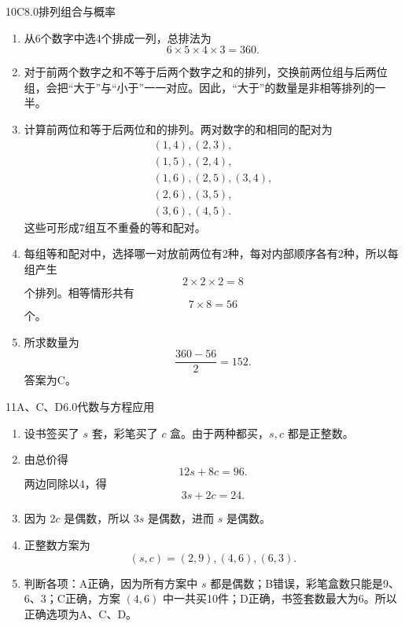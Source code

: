 \begin{solution}{10}{C}{8.0}{排列组合与概率}
\begin{enumerate}[label=\textbf{Step \arabic*:},leftmargin=*]
  \item 从6个数字中选4个排成一列，总排法为
  \[
    6\times5\times4\times3=360.
  \]
  \item 对于前两个数字之和不等于后两个数字之和的排列，交换前两位组与后两位组，会把“大于”与“小于”一一对应。因此，“大于”的数量是非相等排列的一半。
  \item 计算前两位和等于后两位和的排列。两对数字的和相同的配对为
  \[
  \begin{gathered}
    (1,4),(2,3),\\
    (1,5),(2,4),\\
    (1,6),(2,5),(3,4),\\
    (2,6),(3,5),\\
    (3,6),(4,5).
  \end{gathered}
  \]
  这些可形成7组互不重叠的等和配对。
  \item 每组等和配对中，选择哪一对放前两位有2种，每对内部顺序各有2种，所以每组产生
  \[
    2\times2\times2=8
  \]
  个排列。相等情形共有
  \[
    7\times8=56
  \]
  个。
  \item 所求数量为
  \[
    \frac{360-56}{2}=152.
  \]
  答案为C。
\end{enumerate}
\end{solution}

\Needspace{8cm}

\begin{solution}{11}{A、C、D}{6.0}{代数与方程应用}
\begin{enumerate}[label=\textbf{Step \arabic*:},leftmargin=*]
  \item 设书签买了 \(s\) 套，彩笔买了 \(c\) 盒。由于两种都买，\(s,c\) 都是正整数。
  \item 由总价得
  \[
    12s+8c=96.
  \]
  两边同除以4，得
  \[
    3s+2c=24.
  \]
  \item 因为 \(2c\) 是偶数，所以 \(3s\) 是偶数，进而 \(s\) 是偶数。
  \item 正整数方案为
  \[
    (s,c)=(2,9),(4,6),(6,3).
  \]
  \item 判断各项：A正确，因为所有方案中 \(s\) 都是偶数；B错误，彩笔盒数只能是9、6、3；C正确，方案 \((4,6)\) 中一共买10件；D正确，书签套数最大为6。所以正确选项为A、C、D。
\end{enumerate}
\end{solution}

